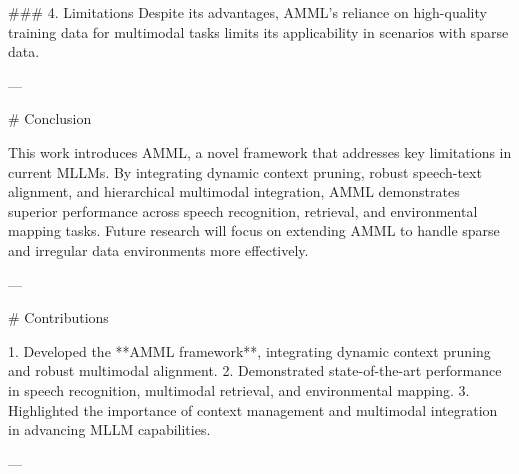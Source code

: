### 4. Limitations
Despite its advantages, AMML's reliance on high-quality training data for multimodal tasks limits its applicability in scenarios with sparse data.

---

# Conclusion

This work introduces AMML, a novel framework that addresses key limitations in current MLLMs. By integrating dynamic context pruning, robust speech-text alignment, and hierarchical multimodal integration, AMML demonstrates superior performance across speech recognition, retrieval, and environmental mapping tasks. Future research will focus on extending AMML to handle sparse and irregular data environments more effectively.

---

# Contributions

1. Developed the **AMML framework**, integrating dynamic context pruning and robust multimodal alignment.
2. Demonstrated state-of-the-art performance in speech recognition, multimodal retrieval, and environmental mapping.
3. Highlighted the importance of context management and multimodal integration in advancing MLLM capabilities.

--- 

